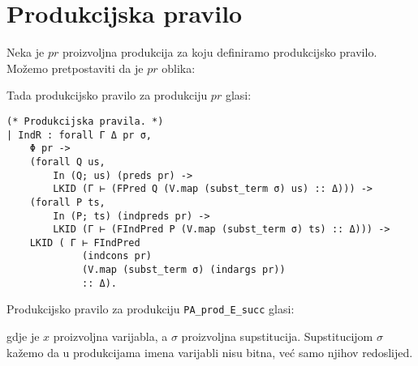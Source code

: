 \section{Produkcijska pravilo}
Neka je \(pr\) proizvoljna produkcija za koju definiramo produkcijsko pravilo.
Možemo pretpostaviti da je \(pr\) oblika:
\begin{prooftree}
\end{prooftree}
\noindent Tada produkcijsko pravilo za produkciju \(pr\) glasi:
\begin{prooftree}
\end{prooftree}
\begin{verbatim}
(* Produkcijska pravila. *)
| IndR : forall Γ Δ pr σ,
    Φ pr ->
    (forall Q us,
        In (Q; us) (preds pr) ->
        LKID (Γ ⊢ (FPred Q (V.map (subst_term σ) us) :: Δ))) ->
    (forall P ts,
        In (P; ts) (indpreds pr) ->
        LKID (Γ ⊢ (FIndPred P (V.map (subst_term σ) ts) :: Δ))) ->
    LKID ( Γ ⊢ FIndPred
             (indcons pr)
             (V.map (subst_term σ) (indargs pr))
             :: Δ).
\end{verbatim}

\begin{example}
  Produkcijsko pravilo za produkciju \texttt{PA\_prod\_E\_succ} glasi:
  \begin{prooftree}
  \end{prooftree}
  \noindent gdje je \(x\) proizvoljna varijabla, a \(\sigma\) proizvoljna supstitucija.
  Supstitucijom \(\sigma\) kažemo da u produkcijama imena varijabli nisu bitna,
  već samo njihov redoslijed.
\end{example}

